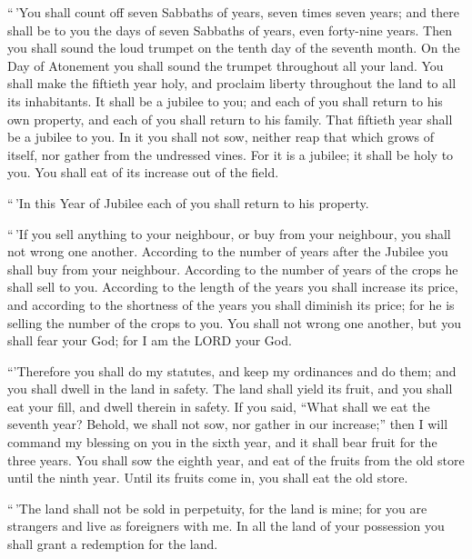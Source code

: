  ``\,'You shall count off seven Sabbaths of years, seven
times seven years; and there shall be to you the days of seven Sabbaths
of years, even forty-nine years.  Then you shall sound the
loud trumpet on the tenth day of the seventh month. On the Day of
Atonement you shall sound the trumpet throughout all your land.
 You shall make the fiftieth year holy, and proclaim
liberty throughout the land to all its inhabitants. It shall be a
jubilee to you; and each of you shall return to his own property, and
each of you shall return to his family.  That fiftieth
year shall be a jubilee to you. In it you shall not sow, neither reap
that which grows of itself, nor gather from the undressed vines.
 For it is a jubilee; it shall be holy to you. You shall
eat of its increase out of the field.

 ``\,'In this Year of Jubilee each of you shall return to
his property.

 ``\,'If you sell anything to your neighbour, or buy from
your neighbour, you shall not wrong one another. 
According to the number of years after the Jubilee you shall buy from
your neighbour. According to the number of years of the crops he shall
sell to you.  According to the length of the years you
shall increase its price, and according to the shortness of the years
you shall diminish its price; for he is selling the number of the crops
to you.  You shall not wrong one another, but you shall
fear your God; for I am the LORD your God.

 ``'Therefore you shall do my statutes, and keep my
ordinances and do them; and you shall dwell in the land in safety.
 The land shall yield its fruit, and you shall eat your
fill, and dwell therein in safety.  If you said, ``What
shall we eat the seventh year? Behold, we shall not sow, nor gather in
our increase;''  then I will command my blessing on you
in the sixth year, and it shall bear fruit for the three years.
 You shall sow the eighth year, and eat of the fruits
from the old store until the ninth year. Until its fruits come in, you
shall eat the old store.

 ``\,'The land shall not be sold in perpetuity, for the
land is mine; for you are strangers and live as foreigners with me.
 In all the land of your possession you shall grant a
redemption for the land.

